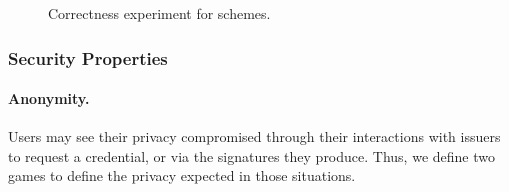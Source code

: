 \begin{figure}[htp!]
  \caption{Correctness experiment for \UAS schemes.}
  \label{fig:exp-uas-corr}
\end{figure}

\subsubsection{Security Properties}
\label{sssec:security}

\paragraph{Anonymity.} %
Users may see their privacy compromised through their interactions with issuers
to request a credential, or via the signatures they produce. Thus, we define two
games to define the privacy expected in those situations.

